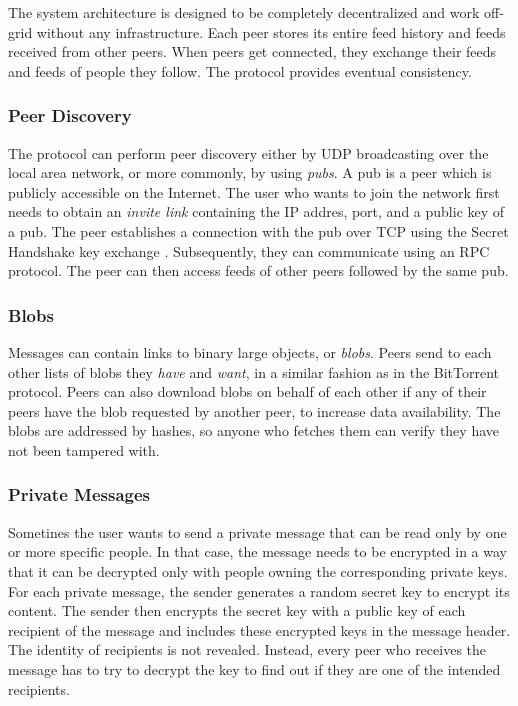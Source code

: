 The system architecture is designed to be completely decentralized and work off-grid without any infrastructure. Each peer stores its entire feed history and feeds received from other peers. When peers get connected, they exchange their feeds and feeds of people they follow. The protocol provides eventual consistency.

\subsubsection{Peer Discovery}

The protocol can perform peer discovery either by UDP broadcasting over the local area network, or more commonly, by using \textit{pubs}. A pub is a peer which is publicly accessible on the Internet. The user who wants to join the network first needs to obtain an \textit{invite link} containing the IP addres, port, and a public key of a pub. The peer establishes a connection with the pub over TCP using the Secret Handshake key exchange \cite{secrethandshake}. Subsequently, they can communicate using an RPC protocol. The peer can then access feeds of other peers followed by the same pub.

\subsubsection{Blobs}

Messages can contain links to binary large objects, or \textit{blobs}. Peers send to each other lists of blobs they \textit{have} and \textit{want}, in a similar fashion as in the BitTorrent protocol. Peers can also download blobs on behalf of each other if any of their peers have the blob requested by another peer, to increase data availability. The blobs are addressed by hashes, so anyone who fetches them can verify they have not been tampered with.

\subsubsection{Private Messages}

Sometines the user wants to send a private message that can be read only by one or more specific people. In that case, the message needs to be encrypted in a way that it can be decrypted only with people owning the corresponding private keys. For each private message, the sender generates a random secret key to encrypt its content. The sender then encrypts the secret key with a public key of each recipient of the message and includes these encrypted keys in the message header. The identity of recipients is not revealed. Instead, every peer who receives the message has to try to decrypt the key to find out if they are one of the intended recipients.

